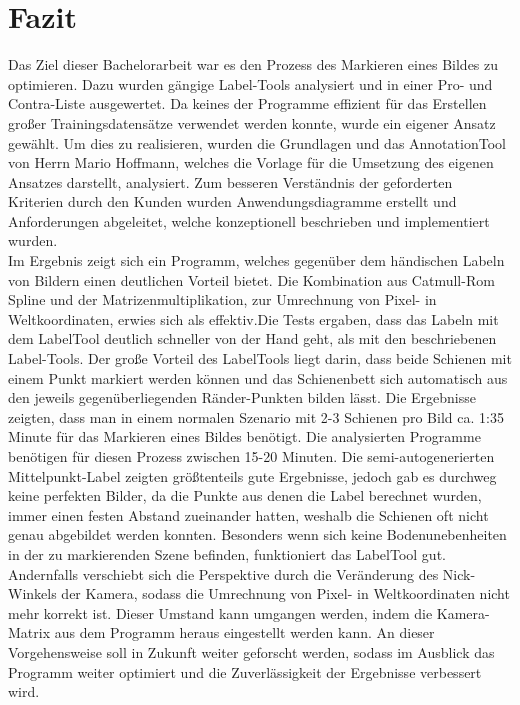 \section{Fazit}\label{fazit}


Das Ziel dieser Bachelorarbeit war es den Prozess des Markieren eines Bildes zu optimieren. Dazu wurden gängige Label-Tools analysiert und in einer Pro- und Contra-Liste ausgewertet. Da keines der Programme effizient für das Erstellen großer Trainingsdatensätze verwendet werden konnte, wurde ein eigener Ansatz gewählt. Um dies zu realisieren, wurden die Grundlagen und das AnnotationTool von Herrn Mario Hoffmann, welches die Vorlage für die Umsetzung des eigenen Ansatzes darstellt, analysiert. Zum besseren Verständnis der geforderten Kriterien durch den Kunden wurden Anwendungsdiagramme erstellt und Anforderungen abgeleitet, welche konzeptionell beschrieben und implementiert wurden.
\\
\noindent
Im Ergebnis zeigt sich ein Programm, welches gegenüber dem händischen Labeln von Bildern einen deutlichen Vorteil bietet. Die Kombination aus Catmull-Rom Spline und der Matrizenmultiplikation, zur Umrechnung von Pixel- in Weltkoordinaten, erwies sich als effektiv.Die Tests ergaben, dass das Labeln mit dem LabelTool deutlich schneller von der Hand geht, als mit den beschriebenen Label-Tools. Der große Vorteil des LabelTools liegt darin, dass beide Schienen mit einem Punkt markiert werden können und das Schienenbett sich automatisch aus den jeweils gegenüberliegenden Ränder-Punkten bilden lässt. Die Ergebnisse zeigten, dass man in einem normalen Szenario mit 2-3 Schienen pro Bild ca. 1:35 Minute für das Markieren eines Bildes benötigt. Die analysierten Programme benötigen für diesen Prozess zwischen 15-20 Minuten. Die semi-autogenerierten Mittelpunkt-Label zeigten größtenteils gute Ergebnisse, jedoch gab es durchweg keine perfekten Bilder, da die Punkte aus denen die Label berechnet wurden, immer einen festen Abstand zueinander hatten, weshalb die Schienen oft nicht genau abgebildet werden konnten.  Besonders wenn sich keine Bodenunebenheiten in der zu markierenden Szene befinden, funktioniert das LabelTool gut. Andernfalls verschiebt sich die Perspektive durch die Veränderung des Nick-Winkels der Kamera, sodass die Umrechnung von Pixel- in Weltkoordinaten nicht mehr korrekt ist. Dieser Umstand kann umgangen werden, indem die Kamera-Matrix aus dem Programm heraus eingestellt werden kann. An dieser Vorgehensweise soll in Zukunft weiter geforscht werden, sodass im Ausblick das Programm weiter optimiert und die Zuverlässigkeit der Ergebnisse verbessert wird.


